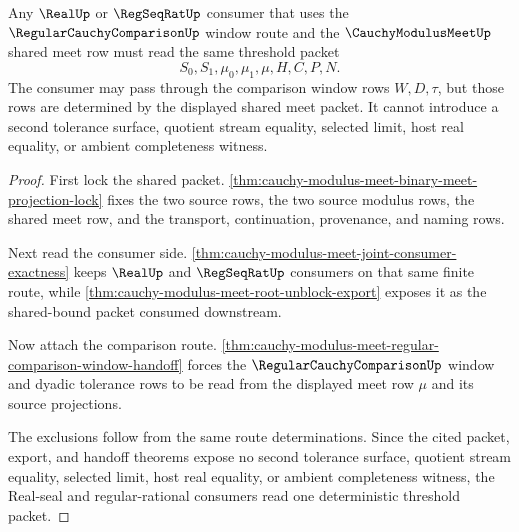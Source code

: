 \begin{theorem}
\label{thm:cauchy-modulus-meet-real-seal-shared-threshold-determinacy}
Any $\RealUp$ or $\RegSeqRatUp$ consumer that uses the $\RegularCauchyComparisonUp$ window route and the $\CauchyModulusMeetUp$ shared meet row must read the same threshold packet
$$
S_0,S_1,\mu_0,\mu_1,\mu,H,C,P,N.
$$
The consumer may pass through the comparison window rows $W,D,\tau$, but those rows are determined by the displayed shared meet packet. It cannot introduce a second tolerance surface, quotient stream equality, selected limit, host real equality, or ambient completeness witness.
\end{theorem}
\begin{proof}
First lock the shared packet. \autoref{thm:cauchy-modulus-meet-binary-meet-projection-lock} fixes the two source rows, the two source modulus rows, the shared meet row, and the transport, continuation, provenance, and naming rows.

Next read the consumer side. \autoref{thm:cauchy-modulus-meet-joint-consumer-exactness} keeps $\RealUp$ and $\RegSeqRatUp$ consumers on that same finite route, while \autoref{thm:cauchy-modulus-meet-root-unblock-export} exposes it as the shared-bound packet consumed downstream.

Now attach the comparison route. \autoref{thm:cauchy-modulus-meet-regular-comparison-window-handoff} forces the $\RegularCauchyComparisonUp$ window and dyadic tolerance rows to be read from the displayed meet row $\mu$ and its source projections.

The exclusions follow from the same route determinations. Since the cited packet, export, and handoff theorems expose no second tolerance surface, quotient stream equality, selected limit, host real equality, or ambient completeness witness, the Real-seal and regular-rational consumers read one deterministic threshold packet.
\end{proof}


